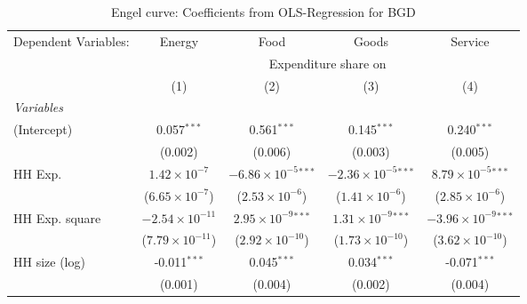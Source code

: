 
\begin{table}[htbp!]
   \centering
   \small
   \begin{adjustbox}{width = 1\textwidth, max height = 0.95\textheight, center}
      \begin{threeparttable}[b]
         \caption{\label{tab:Engel_parametric_BGD} Engel curve: Coefficients from OLS-Regression for BGD}
         \begin{tabular}{lcccc}
            \tabularnewline \midrule \midrule
            Dependent Variables: & Energy                   & Food                           & Goods                          & Service\\  
             & \multicolumn{4}{c}{Expenditure share on} \\ 
                                 & (1)                      & (2)                            & (3)                            & (4)\\  
            \midrule
            \emph{Variables}\\
            (Intercept)          & 0.057$^{***}$            & 0.561$^{***}$                  & 0.145$^{***}$                  & 0.240$^{***}$\\   
                                 & (0.002)                  & (0.006)                        & (0.003)                        & (0.005)\\   
            HH Exp.              & $1.42\times 10^{-7}$     & $-6.86\times 10^{-5}$$^{***}$  & $-2.36\times 10^{-5}$$^{***}$  & $8.79\times 10^{-5}$$^{***}$\\    
                                 & ($6.65\times 10^{-7}$)   & ($2.53\times 10^{-6}$)         & ($1.41\times 10^{-6}$)         & ($2.85\times 10^{-6}$)\\    
            HH Exp. square       & $-2.54\times 10^{-11}$   & $2.95\times 10^{-9}$$^{***}$   & $1.31\times 10^{-9}$$^{***}$   & $-3.96\times 10^{-9}$$^{***}$\\    
                                 & ($7.79\times 10^{-11}$)  & ($2.92\times 10^{-10}$)        & ($1.73\times 10^{-10}$)        & ($3.62\times 10^{-10}$)\\    
            HH size (log)        & -0.011$^{***}$           & 0.045$^{***}$                  & 0.034$^{***}$                  & -0.071$^{***}$\\   
                                 & (0.001)                  & (0.004)                        & (0.002)                        & (0.004)\\   
            \midrule 

\end{tabular}
\end{threeparttable}
\end{adjustbox}
\end{table}
